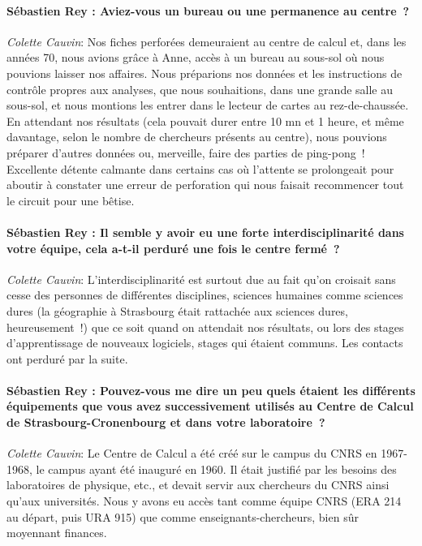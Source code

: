 \paragraph*{Sébastien Rey : Aviez-vous un bureau ou une permanence au centre ?}

\noindent\emph{Colette Cauvin}: Nos fiches perforées demeuraient au centre de calcul et, dans les années 70, nous avions grâce à Anne, accès à un bureau au sous-sol où nous pouvions laisser nos affaires. Nous préparions nos données et les instructions de contrôle propres aux analyses, que nous souhaitions, dans une grande salle au sous-sol, et nous montions les entrer dans le lecteur de cartes au rez-de-chaussée. En attendant nos résultats (cela pouvait durer entre 10 mn et 1 heure, et même davantage, selon le nombre de chercheurs présents au centre), nous pouvions préparer d’autres données ou, merveille, faire des parties de ping-pong ! Excellente détente calmante dans certains cas où l’attente se prolongeait pour aboutir à constater une erreur de perforation qui nous faisait recommencer tout le circuit pour une bêtise. 

\paragraph*{Sébastien Rey : Il semble y avoir eu une forte interdisciplinarité dans votre équipe, cela a-t-il perduré une fois le centre fermé ?}

\noindent\emph{Colette Cauvin}: L’interdisciplinarité est surtout due au fait qu’on croisait sans cesse des personnes de différentes disciplines, sciences humaines comme sciences dures (la géographie à Strasbourg était rattachée aux sciences dures, heureusement !) que ce soit quand on attendait nos résultats, ou lors des stages d’apprentissage de nouveaux logiciels, stages qui étaient communs. Les contacts ont perduré par la suite.

\paragraph*{Sébastien Rey : Pouvez-vous me dire un peu quels étaient les différents équipements que vous avez successivement utilisés au Centre de Calcul de Strasbourg-Cronenbourg et dans votre laboratoire ? }

\noindent\emph{Colette Cauvin}: Le Centre de Calcul a été créé sur le campus du CNRS en 1967-1968, le campus ayant été inauguré en 1960. Il était justifié par les besoins des laboratoires de physique, etc., et devait servir aux chercheurs du CNRS ainsi qu’aux universités. Nous y avons eu accès tant comme équipe CNRS (ERA 214 au départ, puis URA 915) que comme enseignants-chercheurs, bien sûr moyennant finances.

